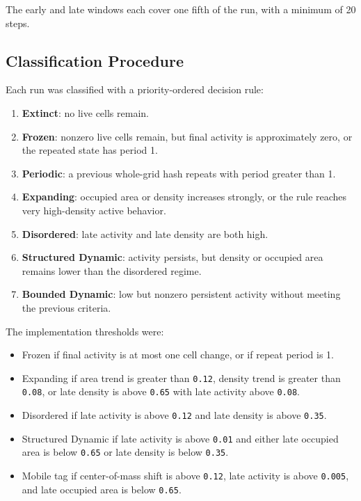 \documentclass[
]{article}
\providecommand{\tightlist}{%
  \setlength{\itemsep}{0pt}\setlength{\parskip}{0pt}}
\begin{document}
The early and late windows each cover one fifth of the run, with a
minimum of 20 steps.

\subsection{Classification Procedure}\label{classification-procedure}

Each run was classified with a priority-ordered decision rule:

\begin{enumerate}
\def\labelenumi{\arabic{enumi}.}
\tightlist
\item
  \textbf{Extinct}: no live cells remain.
\item
  \textbf{Frozen}: nonzero live cells remain, but final activity is
  approximately zero, or the repeated state has period 1.
\item
  \textbf{Periodic}: a previous whole-grid hash repeats with period
  greater than 1.
\item
  \textbf{Expanding}: occupied area or density increases strongly, or
  the rule reaches very high-density active behavior.
\item
  \textbf{Disordered}: late activity and late density are both high.
\item
  \textbf{Structured Dynamic}: activity persists, but density or
  occupied area remains lower than the disordered regime.
\item
  \textbf{Bounded Dynamic}: low but nonzero persistent activity without
  meeting the previous criteria.
\end{enumerate}

The implementation thresholds were:

\begin{itemize}
\tightlist
\item
  Frozen if final activity is at most one cell change, or if repeat
  period is 1.
\item
  Expanding if area trend is greater than \texttt{0.12}, density trend
  is greater than \texttt{0.08}, or late density is above \texttt{0.65}
  with late activity above \texttt{0.08}.
\item
  Disordered if late activity is above \texttt{0.12} and late density is
  above \texttt{0.35}.
\item
  Structured Dynamic if late activity is above \texttt{0.01} and either
  late occupied area is below \texttt{0.65} or late density is below
  \texttt{0.35}.
\item
  Mobile tag if center-of-mass shift is above \texttt{0.12}, late
  activity is above \texttt{0.005}, and late occupied area is below
  \texttt{0.65}.
\end{itemize}
\end{document}
